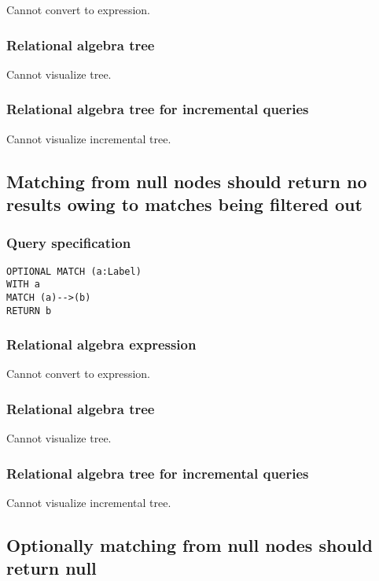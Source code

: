 Cannot convert to expression.

\subsubsection*{Relational algebra tree}

Cannot visualize tree.

\subsubsection*{Relational algebra tree for incremental queries}

Cannot visualize incremental tree.

\subsection{Matching from null nodes should return no results owing to matches being filtered out}

\subsubsection*{Query specification}

\begin{lstlisting}
OPTIONAL MATCH (a:Label)
WITH a
MATCH (a)-->(b)
RETURN b
\end{lstlisting}

\subsubsection*{Relational algebra expression}

Cannot convert to expression.

\subsubsection*{Relational algebra tree}

Cannot visualize tree.

\subsubsection*{Relational algebra tree for incremental queries}

Cannot visualize incremental tree.

\subsection{Optionally matching from null nodes should return null}

